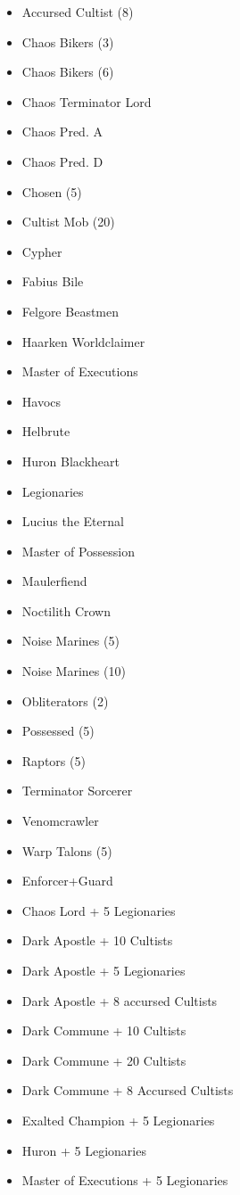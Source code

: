 \documentclass{HordeModeTarot}
\begin{document}
\begin{multicols}{2}
\begin{itemize}[leftmargin=*]
\item[] Accursed Cultist (8)
\item[] Chaos Bikers (3)
\item[] Chaos Bikers (6)
\item[] Chaos Terminator Lord
\item[] Chaos Pred. A
\item[] Chaos Pred. D
\item[] Chosen (5)
\item[] Cultist Mob (20)
\item[] Cypher
\item[] Fabius Bile
\item[] Felgore Beastmen
\item[] Haarken Worldclaimer
\item[] Master of Executions
\item[] Havocs
\item[] Helbrute
\item[] Huron Blackheart
\item[] Legionaries
\item[] Lucius the Eternal
\item[] Master of Possession
\item[] Maulerfiend
\item[] Noctilith Crown
\item[] Noise Marines (5)
\item[] Noise Marines (10)
\item[] Obliterators (2)
\item[] Possessed (5)
\item[] Raptors (5)
\item[] Terminator Sorcerer
\item[] Venomcrawler
\item[] Warp Talons (5)
\item[] Enforcer+Guard
\item[] Chaos Lord + 5 Legionaries
\item[] Dark Apostle + 10 Cultists
\item[] Dark Apostle + 5 Legionaries
\item[] Dark Apostle + 8 accursed Cultists
\item[] Dark Commune + 10 Cultists
\item[] Dark Commune + 20 Cultists
\item[] Dark Commune + 8 Accursed Cultists
\item[] Exalted Champion + 5 Legionaries
\item[] Huron + 5 Legionaries
\item[] Master of Executions + 5 Legionaries
\end{itemize}


\end{multicols}
\end{document}
